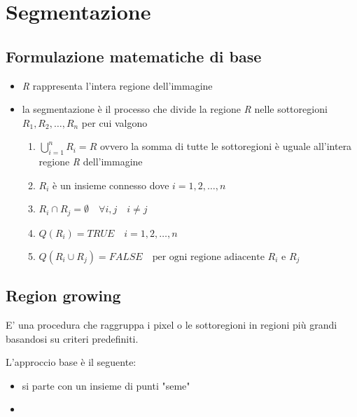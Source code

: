 \chapter{Segmentazione}

\section{Formulazione matematiche di base}

\begin{itemize}
	\item \textit{R} rappresenta l'intera regione dell'immagine
	\item la segmentazione è il processo che divide la regione \textit{R} nelle sottoregioni $R_1, R_2, \dots, R_n$ per cui valgono
	\begin{enumerate}
		\item $\bigcup_{i=1}^{n} R_i = R$ \quad ovvero la somma di tutte le sottoregioni è uguale all'intera regione \textit{R} dell'immagine
		
		\item $R_i$ è un insieme \gls{connesso} dove $i = 1, 2, \dots, n$
		\item $R_i \cap R_j = \emptyset \quad \forall i,j \quad i \neq j$
		\item $Q(R_i) = TRUE \quad i = 1, 2, \dots, n$
		\item $Q(R_i \cup R_j) = FALSE \quad \text{per ogni regione adiacente } R_i$ e $R_j$
	\end{enumerate}
\end{itemize}

\section{Region growing}
E' una procedura che raggruppa i pixel o le sottoregioni in regioni più grandi basandosi su criteri predefiniti.

L'approccio base è il seguente:

\begin{itemize}
	\item si parte con un insieme di punti "seme"
	\item 
\end{itemize}